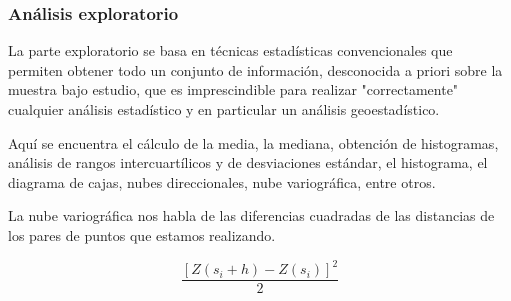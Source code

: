 \subsubsection{Análisis exploratorio}

La parte exploratorio se basa en técnicas estadísticas convencionales que permiten obtener todo un conjunto de información, desconocida a priori sobre la muestra bajo estudio, que es imprescindible para realizar "correctamente" cualquier análisis estadístico y en particular un análisis geoestadístico.  \cite{notas_clase2}

Aquí se encuentra el cálculo de la  media, la mediana, obtención de histogramas, análisis de rangos intercuartílicos y de desviaciones estándar, el histograma, el diagrama de cajas, nubes direccionales, nube variográfica, entre otros. 

La nube variográfica nos habla de las diferencias cuadradas de las distancias de los pares de puntos que estamos realizando.

$$ \frac{[Z(s_i+h)-Z(s_i)]^2}{2}$$
